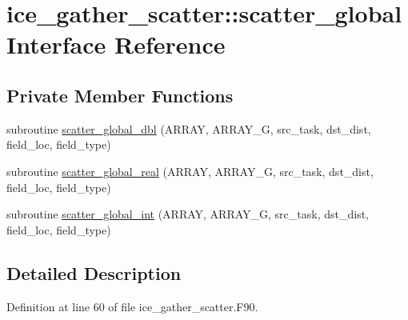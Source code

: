 \hypertarget{interfaceice__gather__scatter_1_1scatter__global}{
\section{ice\_\-gather\_\-scatter::scatter\_\-global Interface Reference}
\label{interfaceice__gather__scatter_1_1scatter__global}
}
\subsection*{Private Member Functions}
\begin{DoxyCompactItemize}
\item 
subroutine \hyperlink{interfaceice__gather__scatter_1_1scatter__global_ab3f5554c0499b5d48c352b2d83059931}{scatter\_\-global\_\-dbl} (ARRAY, ARRAY\_\-G, src\_\-task, dst\_\-dist, field\_\-loc, field\_\-type)
\item 
subroutine \hyperlink{interfaceice__gather__scatter_1_1scatter__global_a731bb7bee6c2c6c144477197c6abac73}{scatter\_\-global\_\-real} (ARRAY, ARRAY\_\-G, src\_\-task, dst\_\-dist, field\_\-loc, field\_\-type)
\item 
subroutine \hyperlink{interfaceice__gather__scatter_1_1scatter__global_af90f731e0b76882ffbf0031b43a1f379}{scatter\_\-global\_\-int} (ARRAY, ARRAY\_\-G, src\_\-task, dst\_\-dist, field\_\-loc, field\_\-type)
\end{DoxyCompactItemize}


\subsection{Detailed Description}


Definition at line 60 of file ice\_\-gather\_\-scatter.F90.

